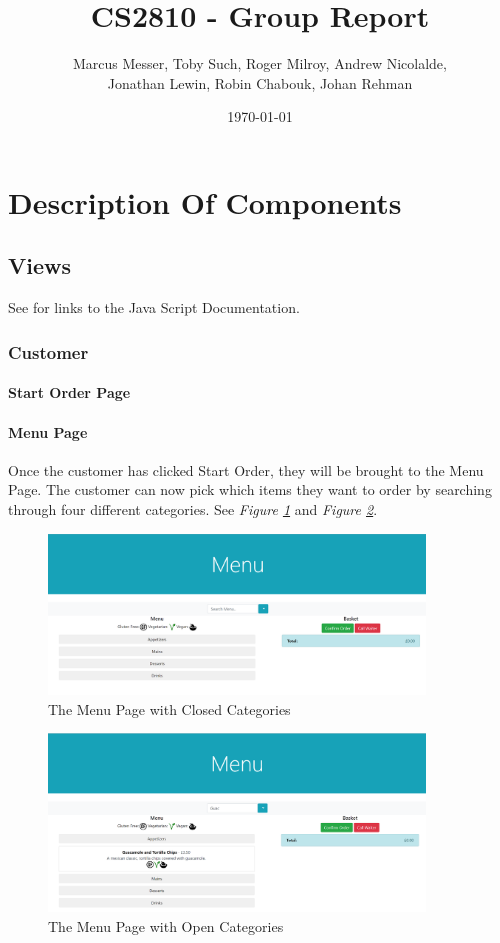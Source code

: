 \documentclass[12pt, twoside, a4paper]{report}
\title{CS2810 - Group Report}
\author{Marcus Messer, Toby Such, Roger Milroy, Andrew Nicolalde,\\
Jonathan Lewin, Robin Chabouk, Johan Rehman}
\date{\today}
\begin{document}
\maketitle
\pagestyle{fancy}
\fancyhf{}

\chapter*{Description Of Components}
\section*{Views}
See \textit{} for links to the Java Script Documentation.
\subsection*{Customer}
\subsubsection*{Start Order Page}

\subsubsection*{Menu Page}
Once the customer has clicked Start Order, they will be brought to the Menu Page. The customer can now pick which items they want to order by searching through four different categories. See \textit{Figure \ref{fig:menuClosed}} and \textit{Figure \ref{fig:menuOpen}}.

\begin{figure}[H]
  \centering
  \includegraphics[width=10cm]{MenuClosed.png}
  \caption{The Menu Page with Closed Categories}
  \label{fig:menuClosed}
\end{figure}

\begin{figure}[H]
  \centering
  \includegraphics[width=10cm]{MenuOpen.png}
  \caption{The Menu Page with Open Categories}
  \label{fig:menuOpen}
\end{figure}
\end{document}
